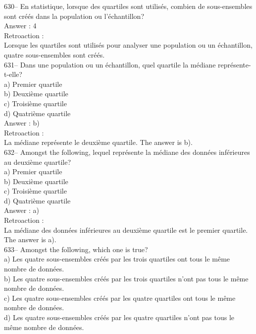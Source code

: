 ﻿\documentclass[letterpaper, 12pt]{article}
\begin{document}
630-- En statistique, lorsque des quartiles sont utilis\'es, combien de
sous-ensembles sont cr\'e\'es dans la population ou l'\'echantillon?\\

Answer : 4\\

Retroaction : \\
Lorsque les quartiles sont utilis\'es pour analyser une population ou un
\'echantillon, quatre sous-ensembles sont cr\'e\'es.\\

631-- Dans une population ou un \'echantillon, quel quartile la m\'ediane
repr\'esente-t-elle?\\
a) Premier quartile\\
b) Deuxi\`eme quartile\\
c) Troisi\`eme quartile\\
d) Quatri\`eme quartile\\

Answer : b)\\

Retroaction : \\
La m\'ediane repr\'esente le deuxi\`eme quartile.  The answer is b).\\

632-- Amongst the following, lequel repr\'esente la m\'ediane
des donn\'ees inf\'erieures au deuxi\`eme quartile?\\
a) Premier quartile\\
b) Deuxi\`eme quartile\\
c) Troisi\`eme quartile\\
d) Quatri\`eme quartile\\

Answer : a)\\

Retroaction : \\
La m\'ediane des donn\'ees inf\'erieures au deuxi\`eme quartile est le
premier quartile.  The answer is a).\\

633-- Amongst the following, which one is true?\\
a) Les quatre sous-ensembles cr\'e\'es par les trois quartiles ont tous le
m\^eme nombre de donn\'ees.  \\
b) Les quatre sous-ensembles cr\'e\'es par les trois quartiles n'ont pas
tous le m\^eme nombre de donn\'ees.  \\
c) Les quatre sous-ensembles cr\'e\'es par les quatre quartiles ont tous le
m\^eme nombre de donn\'ees.  \\
d) Les quatre sous-ensembles cr\'e\'es par les quatre quartiles n'ont pas
tous le m\^eme nombre de donn\'ees.  \\
\end{document}
